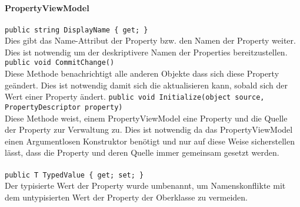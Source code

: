 \subsection{}

\paragraph{\name PropertyViewModel}
\begin{itemize}
	\add \verb!public string DisplayName { get; }! \\
	Dies gibt das Name-Attribut der Property bzw. den Namen der Property weiter. Dies ist notwendig um der  deskriptivere Namen der Properties bereitzustellen.
	\add \verb!public void CommitChange()! \\
	Diese Methode benachrichtigt alle anderen Objekte dass sich diese Property geändert. Dies ist notwendig damit sich die  aktualisieren kann, sobald sich der Wert einer Property ändert.
	\add \verb!public void Initialize(object source, PropertyDescriptor property)! \\
	Diese Methode weist, einem PropertyViewModel eine Property und die Quelle der Property zur Verwaltung zu. Dies ist notwendig da das PropertyViewModel einen Argumentlosen Konstruktor benötigt und nur auf diese Weise sicherstellen lässt, dass die Property und deren Quelle immer gemeinsam gesetzt werden.
\end{itemize}

\paragraph{}
\begin{itemize}
	\change \verb!public T TypedValue { get; set; }! \\
	Der typisierte Wert der Property wurde umbenannt, um Namenskonflikte mit dem untypisierten Wert der Property der Oberklasse zu vermeiden.
\end{itemize}